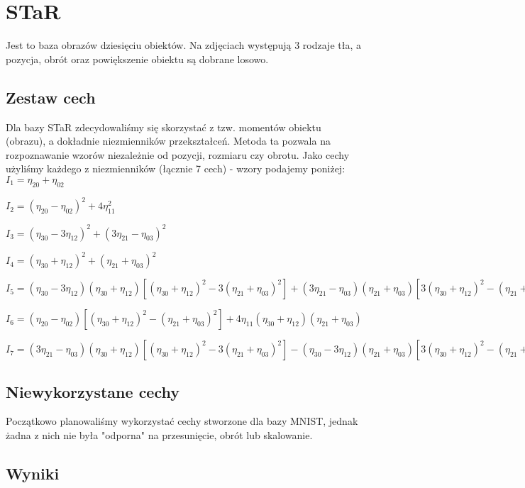 \documentclass{classrep}
\begin{document}
\section{STaR}

Jest to baza obrazów dziesięciu obiektów. Na zdjęciach występują 3 rodzaje tła, a pozycja, obrót oraz powiększenie obiektu są dobrane losowo.

\subsection{Zestaw cech}

Dla bazy STaR zdecydowaliśmy się skorzystać z tzw. momentów obiektu (obrazu), a dokładnie niezmienników przekształceń. Metoda ta pozwala na rozpoznawanie wzorów  niezależnie od pozycji, rozmiaru czy obrotu. Jako cechy użyliśmy każdego z niezmienników (łącznie 7 cech) - wzory podajemy poniżej:\\

$I_1 = \eta_{20} + \eta_{02}$

$I_2 = (\eta_{20} - \eta_{02})^2 + 4\eta_{11}^2$

$I_3 = (\eta_{30} - 3\eta_{12})^2 + (3\eta_{21} - \eta_{03})^2$

$ I_4 = (\eta_{30} + \eta_{12})^2 + (\eta_{21} + \eta_{03})^2$

$ I_5 = (\eta_{30} - 3\eta_{12}) (\eta_{30} + \eta_{12})[ (\eta_{30} + \eta_{12})^2 - 3 (\eta_{21} + \eta_{03})^2] + (3 \eta_{21} - \eta_{03}) (\eta_{21} + \eta_{03})[ 3(\eta_{30} + \eta_{12})^2 -  (\eta_{21} + \eta_{03})^2]$

$I_6 =  (\eta_{20} - \eta_{02})[(\eta_{30} + \eta_{12})^2 - (\eta_{21} + \eta_{03})^2] + 4\eta_{11}(\eta_{30} + \eta_{12})(\eta_{21} + \eta_{03})$

$I_7 = (3 \eta_{21} - \eta_{03})(\eta_{30} + \eta_{12})[(\eta_{30} + \eta_{12})^2 - 3(\eta_{21} + \eta_{03})^2] - (\eta_{30} - 3\eta_{12})(\eta_{21} + \eta_{03})[3(\eta_{30} + \eta_{12})^2 - (\eta_{21} + \eta_{03})^2]$

\subsection{Niewykorzystane cechy}

Początkowo planowaliśmy wykorzystać cechy stworzone dla bazy MNIST, jednak żadna z nich nie była "odporna" na przesunięcie, obrót lub skalowanie.

\subsection{Wyniki}
\end{document}

